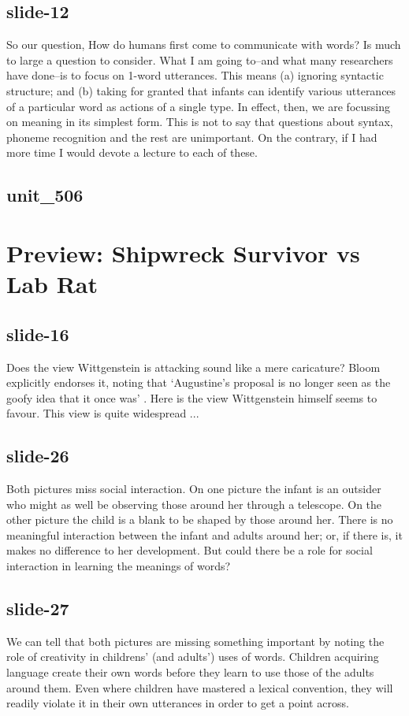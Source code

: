 \documentclass[12pt,\papersize]{extarticle}
\begin{document}
\subsection{slide-12}
So our question,
How do humans first come to communicate with words?
Is much to large a question to consider. What I am going to--and what many researchers have done--is to focus on 1-word utterances. This means (a) ignoring syntactic structure; and (b) taking for granted that infants can identify various utterances of a particular word as actions of a single type. In effect, then, we are focussing on meaning in its simplest form.
This is not to say that questions about syntax, phoneme recognition and the rest are unimportant. On the contrary, if I had more time I would devote a lecture to each of these.
 
 
\subsection{unit\_506}
 
\section{Preview: Shipwreck Survivor vs Lab Rat}
 
 
\subsection{slide-16}
Does the view Wittgenstein is attacking sound like a mere caricature? Bloom explicitly endorses it, noting that ‘Augustine’s proposal is no longer seen as the goofy idea that it once was’ \citep[p.\ 61]{Bloom:2000qz}.
Here is the view Wittgenstein himself seems to favour.
This view is quite widespread ...
 
 
\subsection{slide-26}
Both pictures miss social interaction. On one picture the infant is an outsider who might as well be observing those around her through a telescope. On the other picture the child is a blank to be shaped by those around her. There is no meaningful interaction between the infant and adults around her; or, if there is, it makes no difference to her development. But could there be a role for social interaction in learning the meanings of words?
 
 
\subsection{slide-27}
We can tell that both pictures are missing something important by noting the role of creativity in childrens' (and adults') uses of words.
Children acquiring language create their own words before they learn to use those of the adults around them.
Even where children have mastered a lexical convention, they will readily violate it in their own utterances in order to get a point across.
 
\end{document}
